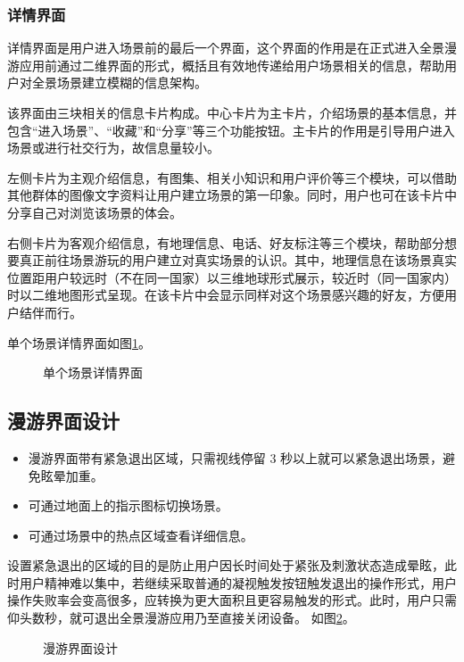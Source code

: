\subsubsection{详情界面}
详情界面是用户进入场景前的最后一个界面，这个界面的作用是在正式进入全景漫游应用前通过二维界面的形式，概括且有效地传递给用户场景相关的信息，帮助用户对全景场景建立模糊的信息架构。

该界面由三块相关的信息卡片构成。中心卡片为主卡片，介绍场景的基本信息，并包含“进入场景”、“收藏”和“分享”等三个功能按钮。主卡片的作用是引导用户进入场景或进行社交行为，故信息量较小。

左侧卡片为主观介绍信息，有图集、相关小知识和用户评价等三个模块，可以借助其他群体的图像文字资料让用户建立场景的第一印象。同时，用户也可在该卡片中分享自己对浏览该场景的体会。

右侧卡片为客观介绍信息，有地理信息、电话、好友标注等三个模块，帮助部分想要真正前往场景游玩的用户建立对真实场景的认识。其中，地理信息在该场景真实位置距用户较远时（不在同一国家）以三维地球形式展示，较近时（同一国家内）时以二维地图形式呈现。在该卡片中会显示同样对这个场景感兴趣的好友，方便用户结伴而行。

单个场景详情界面如图\ref{fig:d-07}。

\begin{figure}[htp]
\centering
{}
\caption{单个场景详情界面}
\label{fig:d-07}
\end{figure}

\subsection{漫游界面设计}
\begin{itemize}
	\item 漫游界面带有紧急退出区域，只需视线停留 3 秒以上就可以紧急退出场景，避免眩晕加重。
	\item 可通过地面上的指示图标切换场景。
	\item 可通过场景中的热点区域查看详细信息。
\end{itemize}

设置紧急退出的区域的目的是防止用户因长时间处于紧张及刺激状态造成晕眩，此时用户精神难以集中，若继续采取普通的凝视触发按钮触发退出的操作形式，用户操作失败率会变高很多，应转换为更大面积且更容易触发的形式。此时，用户只需仰头数秒，就可退出全景漫游应用乃至直接关闭设备。
如图\ref{fig:scenery}。

\begin{figure}[htp]
\centering
{}
\caption{漫游界面设计}
\label{fig:scenery}
\end{figure}

